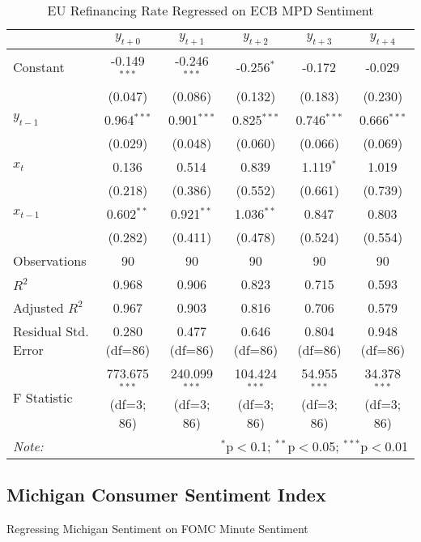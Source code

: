 \documentclass[12pt, letterpaper]{article}
\begin{document}
\begin{table}[H] \centering
  \caption{EU Refinancing Rate Regressed on ECB MPD Sentiment}
  \begin{adjustbox}{width=\textwidth}
\begin{tabular}{lccccc}
\hline
\hline
 & $y_{t+0}$ & $y_{t+1}$ & $y_{t+2}$ & $y_{t+3}$ & $y_{t+4}$  \\
\hline
 Constant & -0.149$^{***}$ & -0.246$^{***}$ & -0.256$^{*}$ & -0.172$^{}$ & -0.029$^{}$ \\
& (0.047) & (0.086) & (0.132) & (0.183) & (0.230) \\
 $y_{t-1}$ & 0.964$^{***}$ & 0.901$^{***}$ & 0.825$^{***}$ & 0.746$^{***}$ & 0.666$^{***}$ \\
& (0.029) & (0.048) & (0.060) & (0.066) & (0.069) \\
 $x_{t}$ & 0.136$^{}$ & 0.514$^{}$ & 0.839$^{}$ & 1.119$^{*}$ & 1.019$^{}$ \\
& (0.218) & (0.386) & (0.552) & (0.661) & (0.739) \\
 $x_{t-1}$ & 0.602$^{**}$ & 0.921$^{**}$ & 1.036$^{**}$ & 0.847$^{}$ & 0.803$^{}$ \\
& (0.282) & (0.411) & (0.478) & (0.524) & (0.554) \\
\hline
 Observations & 90 & 90 & 90 & 90 & 90 \\
 $R^2$ & 0.968 & 0.906 & 0.823 & 0.715 & 0.593 \\
 Adjusted $R^2$ & 0.967 & 0.903 & 0.816 & 0.706 & 0.579 \\
 Residual Std. Error & 0.280 (df=86) & 0.477 (df=86) & 0.646 (df=86) & 0.804 (df=86) & 0.948 (df=86) \\
 F Statistic & 773.675$^{***}$ (df=3; 86) & 240.099$^{***}$ (df=3; 86) & 104.424$^{***}$ (df=3; 86) & 54.955$^{***}$ (df=3; 86) & 34.378$^{***}$ (df=3; 86) \\
\hline
\hline
\textit{Note:} & \multicolumn{5}{r}{$^{*}$p$<$0.1; $^{**}$p$<$0.05; $^{***}$p$<$0.01} \\
\end{tabular}
\end{adjustbox}
\end{table}

\subsection{Michigan Consumer Sentiment Index}

Regressing Michigan Sentiment on FOMC Minute Sentiment
\end{document}
